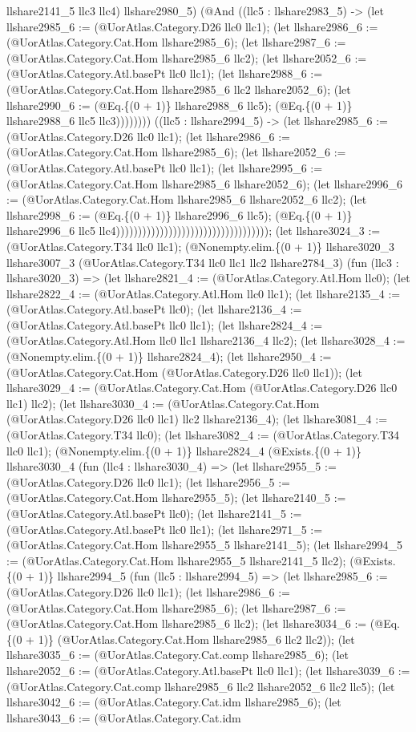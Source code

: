 \documentclass[11pt]{article}
\begin{document}
llshare2141\_5 llc3 llc4) llshare2980\_5) (@And ((llc5 : llshare2983\_5) -> (let llshare2985\_6 := (@UorAtlas.Category.D26 llc0 llc1); (let llshare2986\_6 := (@UorAtlas.Category.Cat.Hom llshare2985\_6); (let llshare2987\_6 := (@UorAtlas.Category.Cat.Hom llshare2985\_6 llc2); (let llshare2052\_6 := (@UorAtlas.Category.Atl.basePt llc0 llc1); (let llshare2988\_6 := (@UorAtlas.Category.Cat.Hom llshare2985\_6 llc2 llshare2052\_6); (let llshare2990\_6 := (@Eq.\{(0 + 1)\} llshare2988\_6 llc5); (@Eq.\{(0 + 1)\} llshare2988\_6 llc5 llc3)))))))) ((llc5 : llshare2994\_5) -> (let llshare2985\_6 := (@UorAtlas.Category.D26 llc0 llc1); (let llshare2986\_6 := (@UorAtlas.Category.Cat.Hom llshare2985\_6); (let llshare2052\_6 := (@UorAtlas.Category.Atl.basePt llc0 llc1); (let llshare2995\_6 := (@UorAtlas.Category.Cat.Hom llshare2985\_6 llshare2052\_6); (let llshare2996\_6 := (@UorAtlas.Category.Cat.Hom llshare2985\_6 llshare2052\_6 llc2); (let llshare2998\_6 := (@Eq.\{(0 + 1)\} llshare2996\_6 llc5); (@Eq.\{(0 + 1)\} llshare2996\_6 llc5 llc4))))))))))))))))))))))))))))))))))); (let llshare3024\_3 := (@UorAtlas.Category.T34 llc0 llc1); (@Nonempty.elim.\{(0 + 1)\} llshare3020\_3 llshare3007\_3 (@UorAtlas.Category.T34 llc0 llc1 llc2 llshare2784\_3) (fun (llc3 : llshare3020\_3) => (let llshare2821\_4 := (@UorAtlas.Category.Atl.Hom llc0); (let llshare2822\_4 := (@UorAtlas.Category.Atl.Hom llc0 llc1); (let llshare2135\_4 := (@UorAtlas.Category.Atl.basePt llc0); (let llshare2136\_4 := (@UorAtlas.Category.Atl.basePt llc0 llc1); (let llshare2824\_4 := (@UorAtlas.Category.Atl.Hom llc0 llc1 llshare2136\_4 llc2); (let llshare3028\_4 := (@Nonempty.elim.\{(0 + 1)\} llshare2824\_4); (let llshare2950\_4 := (@UorAtlas.Category.Cat.Hom (@UorAtlas.Category.D26 llc0 llc1)); (let llshare3029\_4 := (@UorAtlas.Category.Cat.Hom (@UorAtlas.Category.D26 llc0 llc1) llc2); (let llshare3030\_4 := (@UorAtlas.Category.Cat.Hom (@UorAtlas.Category.D26 llc0 llc1) llc2 llshare2136\_4); (let llshare3081\_4 := (@UorAtlas.Category.T34 llc0); (let llshare3082\_4 := (@UorAtlas.Category.T34 llc0 llc1); (@Nonempty.elim.\{(0 + 1)\} llshare2824\_4 (@Exists.\{(0 + 1)\} llshare3030\_4 (fun (llc4 : llshare3030\_4) => (let llshare2955\_5 := (@UorAtlas.Category.D26 llc0 llc1); (let llshare2956\_5 := (@UorAtlas.Category.Cat.Hom llshare2955\_5); (let llshare2140\_5 := (@UorAtlas.Category.Atl.basePt llc0); (let llshare2141\_5 := (@UorAtlas.Category.Atl.basePt llc0 llc1); (let llshare2971\_5 := (@UorAtlas.Category.Cat.Hom llshare2955\_5 llshare2141\_5); (let llshare2994\_5 := (@UorAtlas.Category.Cat.Hom llshare2955\_5 llshare2141\_5 llc2); (@Exists.\{(0 + 1)\} llshare2994\_5 (fun (llc5 : llshare2994\_5) => (let llshare2985\_6 := (@UorAtlas.Category.D26 llc0 llc1); (let llshare2986\_6 := (@UorAtlas.Category.Cat.Hom llshare2985\_6); (let llshare2987\_6 := (@UorAtlas.Category.Cat.Hom llshare2985\_6 llc2); (let llshare3034\_6 := (@Eq.\{(0 + 1)\} (@UorAtlas.Category.Cat.Hom llshare2985\_6 llc2 llc2)); (let llshare3035\_6 := (@UorAtlas.Category.Cat.comp llshare2985\_6); (let llshare2052\_6 := (@UorAtlas.Category.Atl.basePt llc0 llc1); (let llshare3039\_6 := (@UorAtlas.Category.Cat.comp llshare2985\_6 llc2 llshare2052\_6 llc2 llc5); (let llshare3042\_6 := (@UorAtlas.Category.Cat.idm llshare2985\_6); (let llshare3043\_6 := (@UorAtlas.Category.Cat.idm 
\end{document}
